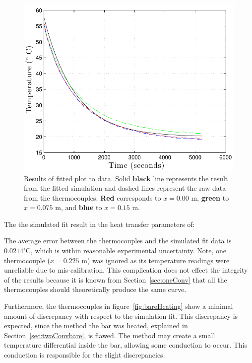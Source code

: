 \documentclass[10pt,aps,prb,twocolumn, nofootinbib]{revtex4-1}
\begin{document}
\begin{figure}[h]
\centering
\includegraphics[width=1.0\linewidth]{bareCooling}
\caption{Results of fitted plot to data. Solid \textbf{black} line represents the result from the fitted simulation and dashed lines represent the raw data from the thermocouples. {\color{red}\textbf{Red}} corresponds to $x = 0.00$ m, {\color{green}\textbf{green}} to $x = 0.075$ m, and {\color{blue}\textbf{blue}} to $x = 0.15$ m.}
\label{fig:bareCooling}
\end{figure}
The the simulated fit result in the heat transfer parameters of:
\begin{center}
\end{center}

\noindent The average error between the thermocouples and the simulated fit data is $0.0214 ^\circ$C, which is within reasonable experimental uncertainty. Note, one thermocouple ($x = 0.225 \text{ m}$) was ignored as its temperature readings were unreliable due to mis-calibration. This complication does not effect the integrity of the results because it is known from Section~\ref{sec:oneConv} that all the thermocouples should theoretically produce the same curve. 

Furthermore, the thermocouples in figure~\ref{fig:bareHeating} show a minimal amount of discrepancy with respect to the simulation fit. This discrepancy is expected, since the method the bar was heated, explained in Section~\ref{sec:twoConvbare}, is flawed. The method may create a small temperature differential inside the bar, allowing some conduction to occur. This conduction is responsible for the slight discrepancies.
\end{document}
